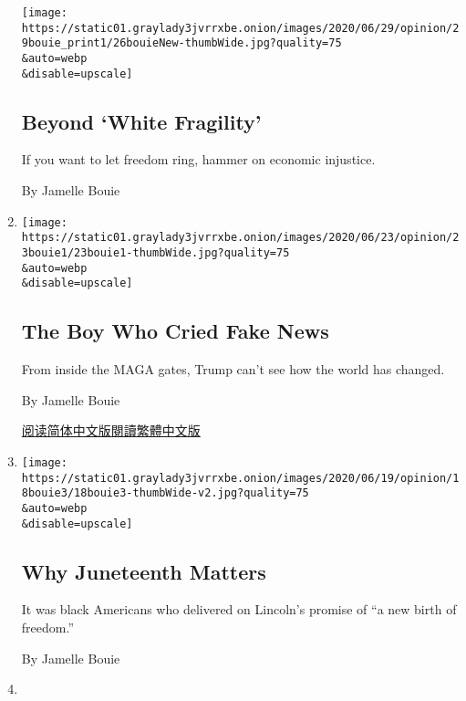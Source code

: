 \begin{enumerate}
  \texttt{[image: https://static01.graylady3jvrrxbe.onion/images/2020/06/29/opinion/29bouie\_print1/26bouieNew-thumbWide.jpg?quality=75\\\&auto=webp\\\&disable=upscale]}

  \hypertarget{beyond-white-fragility}{%
  \subsection{Beyond `White Fragility'}\label{beyond-white-fragility}}

  If you want to let freedom ring, hammer on economic injustice.

  By Jamelle Bouie
\item
  \href{/2020/06/23/opinion/maga-trump-fake-news.html}{}

  \texttt{[image: https://static01.graylady3jvrrxbe.onion/images/2020/06/23/opinion/23bouie1/23bouie1-thumbWide.jpg?quality=75\\\&auto=webp\\\&disable=upscale]}

  \hypertarget{the-boy-who-cried-fake-news}{%
  \subsection{The Boy Who Cried Fake
  News}\label{the-boy-who-cried-fake-news}}

  From inside the MAGA gates, Trump can't see how the world has changed.

  By Jamelle Bouie

  \href{https://cn.nytimes3xbfgragh.onion/opinion/20200624/maga-trump-fake-news/}{阅读简体中文版}\href{https://cn.nytimes3xbfgragh.onion/opinion/20200624/maga-trump-fake-news/zh-hant/}{閱讀繁體中文版}
\item
  \href{/2020/06/18/opinion/juneteenth-slavery-freedom.html}{}

  \texttt{[image: https://static01.graylady3jvrrxbe.onion/images/2020/06/19/opinion/18bouie3/18bouie3-thumbWide-v2.jpg?quality=75\\\&auto=webp\\\&disable=upscale]}

  \hypertarget{why-juneteenth-matters}{%
  \subsection{Why Juneteenth Matters}\label{why-juneteenth-matters}}

  It was black Americans who delivered on Lincoln's promise of ``a new
  birth of freedom.''

  By Jamelle Bouie
\item
  \href{/2020/06/12/opinion/sunday/floyd-protests-white-supremacy.html}{}


\end{enumerate}
